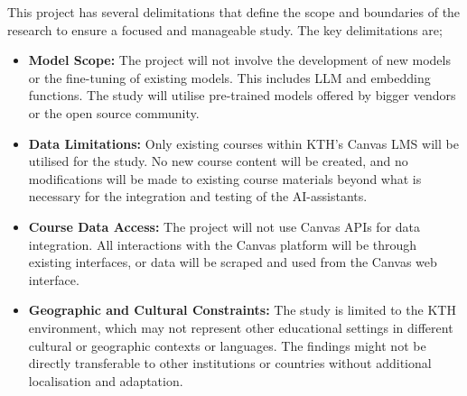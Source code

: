 This project has several delimitations that define the scope and boundaries of the research to ensure a focused and manageable study. The key delimitations are;


\begin{itemize}
        \item \textbf{Model Scope:} The project will not involve the development of new models or the fine-tuning of existing models. This includes \gls{LLM} and embedding functions. The study will utilise pre-trained models offered by bigger vendors or the open source community.
        \item \textbf{Data Limitations:} Only existing courses within KTH's Canvas \gls{LMS} will be utilised for the study. No new course content will be created, and no modifications will be made to existing course materials beyond what is necessary for the integration and testing of the AI-assistants.
        \item \textbf{Course Data Access:} The project will not use Canvas APIs for data integration. All interactions with the Canvas platform will be through existing interfaces, or data will be scraped and used from the Canvas web interface.
        \item \textbf{Geographic and Cultural Constraints:} The study is limited to the KTH environment, which may not represent other educational settings in different cultural or geographic contexts or languages. The findings might not be directly transferable to other institutions or countries without additional localisation and adaptation.
\end{itemize}








\cleardoublepage